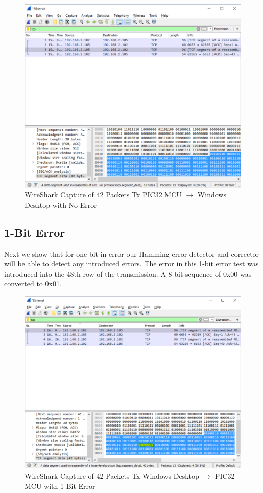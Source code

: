 \documentclass[12pt]{article}
\begin{document}
\begin{figure}[H]
    \centering
    \includegraphics[width=5.5in]{images/wireshark_pictx_noerror_packets.PNG}
    \caption{WireShark Capture of 42 Packets Tx 
        PIC32 MCU $\rightarrow$ Windows Desktop with No Error}
    \label{fig:picnoerror}
\end{figure}

\subsection{1-Bit Error}
\label{sec:1biterror}

Next we show that for one bit in error our Hamming error detector and 
corrector will be able to detect any introduced errors. The error in
this 1-bit error test was introduced into the 48th row of the 
transmission. A 8-bit sequence of 0x00 was converted to 0x01. 

\begin{figure}[H]
    \centering
    \includegraphics[width=5.5in]{images/wireshark_vbtx_1bit_packets.PNG}
    \caption{WireShark Capture of 42 Packets Tx 
        Windows Desktop $\rightarrow$ PIC32 MCU with 1-Bit Error}
    \label{fig:vb1error}
\end{figure}
\end{document}
